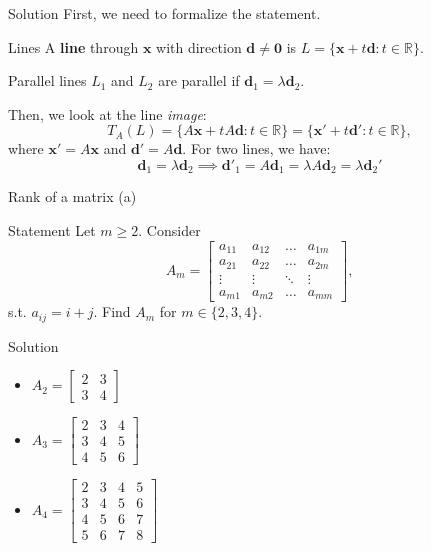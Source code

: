 \documentclass[10pt]{beamer}
\begin{document}
\begin{frame}{Solution}
    First, we need to formalize the statement.
    \begin{block}{Lines}
        A \textbf{line} through $\mathbf x$ with direction $\mathbf d \neq \mathbf 0$ is $L = \{\mathbf x + t \mathbf d: t \in \mathbb R\}$.
    \end{block}
    \begin{block}{Parallel lines}
        $L_1$ and $L_2$ are parallel if $\mathbf d_1 = \lambda \mathbf d_2$.
    \end{block}
    Then, we look at the line \textit{image}:
    $$
    T_A(L) = \{A \mathbf x + t A \mathbf d : t \in \mathbb R\} = \{\mathbf x' + t\mathbf d': t \in \mathbb R\},
    $$
    where $\mathbf x' = A\mathbf x$ and $\mathbf d' = A\mathbf d$. For two lines, we have:
    $$
    \mathbf d_1 = \lambda \mathbf d_2 \implies \mathbf d'_1 = A \mathbf d_1 = \lambda A \mathbf d_2 = \lambda \mathbf d_2'
    $$
\end{frame}

\begin{frame}{Rank of a matrix (a)}
\begin{block}{Statement}
    Let $m \geq 2$. Consider
    $$
    A_m = \begin{bmatrix}
        a_{11} & a_{12} & \dots & a_{1m} \\
        a_{21} & a_{22} & \dots & a_{2m} \\
        \vdots & \vdots & \ddots & \vdots \\
        a_{m1} & a_{m2} & \dots & a_{mm}
    \end{bmatrix},
    $$
    s.t. $a_{ij} = i+j$. Find $A_m$ for $m\in\{2,3,4\}$.
\end{block}
\end{frame}

\begin{frame}{Solution}
    \begin{itemize}
        \item $A_2 = \begin{bmatrix}
            2 & 3 \\
            3 & 4
        \end{bmatrix}$
        \item $A_3 = \begin{bmatrix}
            2 & 3 & 4 \\
            3 & 4 & 5 \\
            4 & 5 & 6
        \end{bmatrix}$
        \item $A_4 = \begin{bmatrix}
            2 & 3 & 4 & 5\\
            3 & 4 & 5 & 6\\
            4 & 5 & 6 & 7\\
            5 & 6 & 7 & 8
        \end{bmatrix}$
    \end{itemize}
\end{frame}
\end{document}
